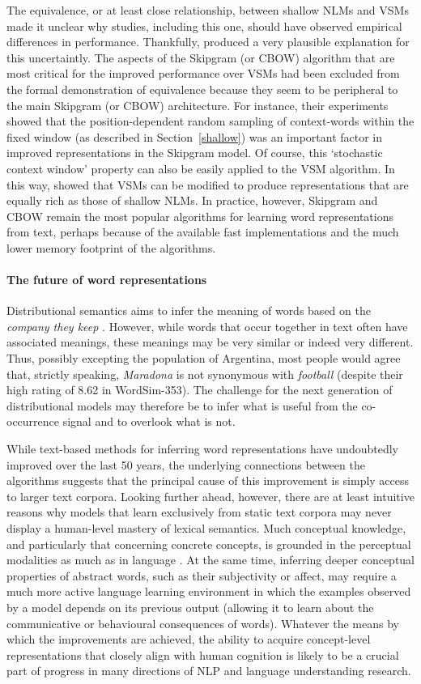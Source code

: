 The equivalence, or at least close relationship, between shallow NLMs and VSMs made it unclear why studies, including this one, should have observed empirical differences in performance. Thankfully, \cite{levy2015improving} produced a very plausible explanation for this uncertaintly. The aspects of the Skipgram (or CBOW) algorithm that are most critical for the improved performance over VSMs had been excluded from the formal demonstration of equivalence because they seem to be peripheral to the main Skipgram (or CBOW) architecture. For instance, their experiments showed that the position-dependent random sampling of context-words within the fixed window (as described in Section~\ref{shallow}) was an important factor in improved representations in the Skipgram model. Of course, this `stochastic context window' property can also be easily applied to the VSM algorithm. In this way, \cite{levy2015improving} showed that VSMs can be modified to produce representations that are equally rich as those of shallow NLMs. In practice, however, Skipgram and CBOW remain the most popular algorithms for learning word representations from text, perhaps because of the available fast implementations and the much lower memory footprint of the algorithms.    

\paragraph{The future of word representations} 
Distributional semantics aims to infer the meaning of words based on the \emph{company they keep} \citep{dist}. However, while words that occur together in text often have associated meanings, these meanings may be very similar or indeed very different. Thus, possibly excepting the population of Argentina, most people would agree that, strictly speaking, \emph{Maradona} is not synonymous with \emph{football} (despite their high rating of 8.62 in WordSim-353). The challenge for the next generation of distributional models may therefore be to infer what is useful from the co-occurrence signal and to overlook what is not. 

While text-based methods for inferring word representations have undoubtedly improved over the last 50 years, the underlying connections between the algorithms suggests that the principal cause of this improvement is simply access to larger text corpora. Looking further ahead, however, there are at least intuitive reasons why models that learn exclusively from static text corpora may never display a human-level mastery of lexical semantics. Much conceptual knowledge, and particularly that concerning concrete concepts, is grounded in the perceptual modalities as much as in language \citep{barsalou2003grounding}. At the same time, inferring deeper conceptual properties of abstract words, such as their subjectivity or affect, may require a much more active language learning environment in which the examples observed by a model depends on its previous output (allowing it to learn about the communicative or behavioural consequences of words). Whatever the means by which the improvements are achieved, the ability to acquire concept-level representations that closely align with human cognition is likely to be a crucial part of progress in many directions of NLP and language understanding research.
